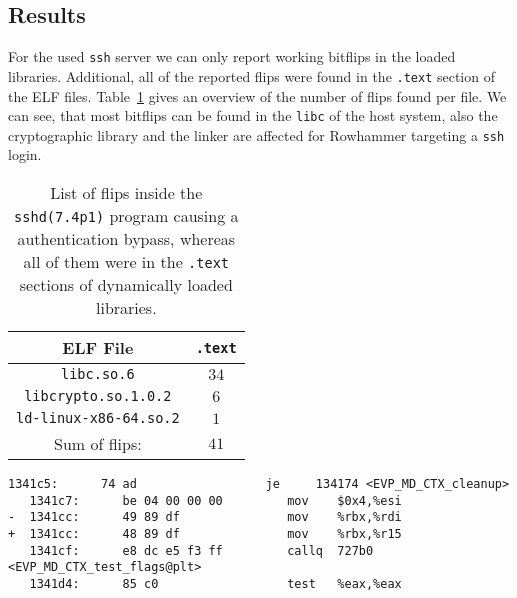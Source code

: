 \subsection{Results}

For the used \texttt{ssh} server we can only report working bitflips in the
loaded libraries. Additional, all of the reported flips were found in the
\texttt{.text} section of the ELF files. Table~\ref{tab:sshdres} gives an
overview of the number of flips found per file. We can see, that most bitflips
can be found in the \texttt{libc} of the host system, also the cryptographic
library and the linker are affected for Rowhammer targeting a \texttt{ssh}
login.

\begin{table}[!htb]
\centering
\begin{tabular}{c|c}
ELF File               & \texttt{.text} \\ \hline
\texttt{libc.so.6}         & $34$ \\
\texttt{libcrypto.so.1.0.2} & $6$ \\
\texttt{ld-linux-x86-64.so.2} & $1$ \\ \hline
Sum of flips:                 & $41$
\end{tabular}
\caption{List of flips inside the \texttt{sshd(7.4p1)} program
causing a authentication bypass, whereas all of them were in the \texttt{.text}
sections of dynamically loaded libraries.}
\label{tab:sshdres}
\end{table}

\begin{minipage}{\linewidth}
\begin{lstlisting}[style=diff,
                   caption={Diff for a bitflip applied to the
\texttt{libcrypto.so.1.0.2} binary in order to bypass a credential check. The
move from \texttt{rbx} to \texttt{rdi} is exchanged with a move to
\texttt{r15}, this changes the parameter for \texttt{EVP\_MD\_CTX\_test\_flags},
which is highly likely to result in a different outcome.},
label=lst:sshdex]
   1341c5:      74 ad                  je     134174 <EVP_MD_CTX_cleanup>
   1341c7:      be 04 00 00 00         mov    $0x4,%esi
-  1341cc:      49 89 df               mov    %rbx,%rdi
+  1341cc:      48 89 df               mov    %rbx,%r15
   1341cf:      e8 dc e5 f3 ff         callq  727b0 <EVP_MD_CTX_test_flags@plt>
   1341d4:      85 c0                  test   %eax,%eax
\end{lstlisting}
\end{minipage}

